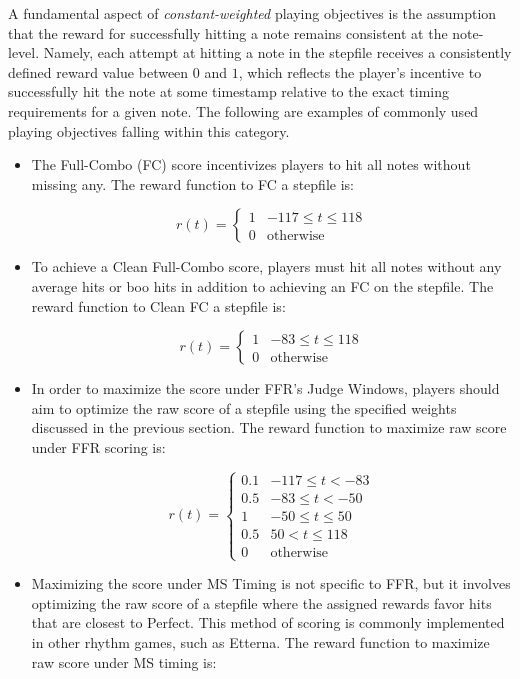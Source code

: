 A fundamental aspect of \textit{constant-weighted} playing objectives is the assumption that the reward for successfully hitting a note remains consistent at the note-level. Namely, each attempt at hitting a note in the stepfile receives a consistently defined reward value between $0$ and $1$, which reflects the player's incentive to successfully hit the note at some timestamp relative to the exact timing requirements for a given note. The following are examples of commonly used playing objectives falling within this category.

\begin{itemize}
    \item The Full-Combo (FC) score incentivizes players to hit all notes without missing any. The reward function to FC a stepfile is:

    $$r(t) = \begin{cases} 
          1 & -117 \leq t \leq 118 \\
          0 & \text{otherwise}
       \end{cases}$$

    \item To achieve a Clean Full-Combo score, players must hit all notes without any average hits or boo hits in addition to achieving an FC on the stepfile. The reward function to Clean FC a stepfile is:

    $$r(t) = \begin{cases} 
          1 & -83 \leq t \leq 118 \\
          0 & \text{otherwise}
       \end{cases}$$

    \item In order to maximize the score under FFR's Judge Windows, players should aim to optimize the raw score of a stepfile using the specified weights discussed in the previous section. The reward function to maximize raw score under FFR scoring is:

    $$r(t) = \begin{cases} 
          0.1 & -117 \leq t < -83 \\
          0.5 & -83 \leq t < -50 \\
          1 & -50 \leq t \leq 50 \\
          0.5 & 50 < t \leq 118 \\
          0 & \text{otherwise}
       \end{cases}$$

    \item Maximizing the score under MS Timing is not specific to FFR, but it involves optimizing the raw score of a stepfile where the assigned rewards favor hits that are closest to Perfect. This method of scoring is commonly implemented in other rhythm games, such as Etterna. The reward function to maximize raw score under MS timing is:


\end{itemize}
